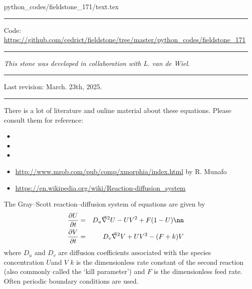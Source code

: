 \begin{flushright} {\tiny {\color{gray} python\_codes/fieldstone\_171/text.tex}} \end{flushright}

%

\par\noindent\rule{\textwidth}{0.4pt}

\begin{center}
\inpython
{\small Code: \url{https://github.com/cedrict/fieldstone/tree/master/python_codes/fieldstone_171}}
\end{center}

\par\noindent\rule{\textwidth}{0.4pt}

{\sl This stone was developed in collaboration with L. van de Wiel}. 

\par\noindent\rule{\textwidth}{0.4pt}

Last revision: March. 23th, 2025.

\par\noindent\rule{\textwidth}{0.4pt}


There is a lot of literature and online material about these equations. Please consult them 
for reference:
\begin{itemize}
\item {}
\item {}
\item {}
\item \url{http://www.mrob.com/pub/comp/xmorphia/index.html} by R. Munafo
\item \url{https://en.wikipedia.org/wiki/Reaction-diffusion_system}
\end{itemize}

The Gray–Scott reaction–diffusion system of equations are given by
\begin{eqnarray}
\frac{\partial U}{\partial t} &=& D_u \vec\nabla^2 U - UV^2 + F(1-U) \nn\\
\frac{\partial V}{\partial t} &=& D_v \vec\nabla^2 V + UV^2 - (F+k)V 
\end{eqnarray}
where $D_u$ and $D_v$ are diffusion coefficients associated with the species concentration $U$and $V$
$k$ is the dimensionless rate constant of the second reaction (also commonly called the `kill 
parameter') and $F$ is the dimensionless feed rate.
Often periodic boundary conditions are used. 

